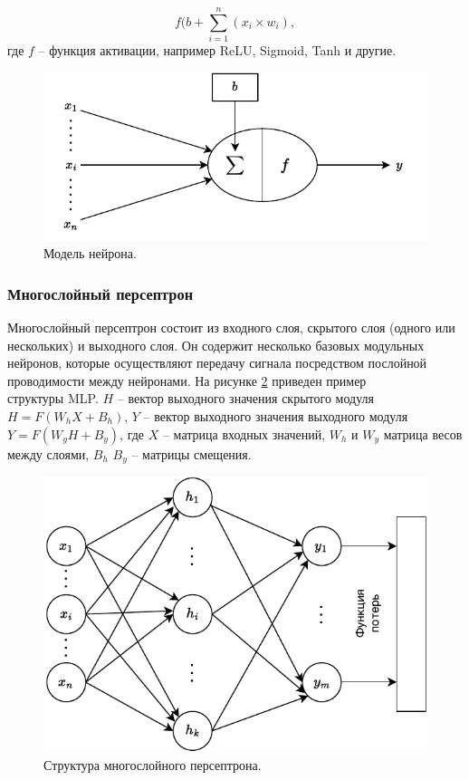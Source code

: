\begin{equation}
f(b + \sum_{i=1}^{n}(x_i \times w_i),
\end{equation}
где $f$ -- функция активации, например ReLU, Sigmoid, Tanh и другие.

\begin{figure}[hbtp]
	\centering
	\includegraphics[width=\textwidth]{img/neuron.pdf}
	\caption{Модель нейрона.}
	\label{fig:neuron}
\end{figure}




\subsubsection{Многослойный персептрон}

Многослойный персептрон состоит из входного слоя, скрытого слоя (одного или нескольких) и выходного слоя. Он содержит несколько базовых модульных нейронов, которые осуществляют передачу сигнала посредством послойной проводимости между нейронами. На рисунке \ref{fig:mlp} приведен пример \\структуры MLP. $H$ -- вектор выходного значения скрытого модуля \\$H=F(W_{h}X+B_h)$, $Y$ -- вектор выходного значения выходного модуля \\$Y=F(W_{y}H+B_y)$, где $X$ -- матрица входных значений, $W_h$ и $W_y$ матрица весов между слоями, $B_h$ $B_y$ -- матрицы смещения.

\begin{figure}[hbtp]
	\centering
	\includegraphics[scale=1.5]{img/mlp.pdf}
	\caption{Структура многослойного персептрона.}
	\label{fig:mlp}
\end{figure}


